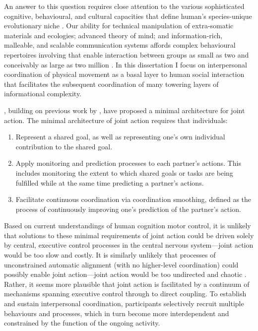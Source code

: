 \begin{CJK}{UTF8}{gbsn}
An answer to this question requires close attention to the various sophisticated cognitive, behavioural, and cultural capacities that define human's species-unique evolutionary niche \citep{Roepstorff2010,Clark2015,Fuentes2016}. Our ability for technical manipulation of extra-somatic materials and ecologies; advanced theory of mind; and information-rich, malleable, and scalable communication systems affords complex behavioural repertoires involving that enable interaction between groups as small as two and conceivably as large as two million \citep{Nowak2017}.  In this dissertation I focus on interpersonal coordination of physical movement as a basal layer to human social interaction that facilitates the subsequent coordination of many towering layers of informational complexity.

\textcite{Vesper2010}, building on previous work by  \textcite{Sebanz2006}, have proposed a minimal architecture for joint action.  The minimal architecture of joint action requires that individuals:

\begin{enumerate}
  \item Represent a shared goal, as well as representing one’s own individual contribution to the shared goal.
  \item Apply monitoring and prediction processes to each partner’s actions. This includes monitoring the extent to which shared goals or tasks are being fulfilled while at the same time predicting a partner’s actions.
  \item Facilitate continuous coordination via coordination smoothing, defined as the process of continuously improving one’s prediction of the partner’s action.
\end{enumerate}

Based on current understandings of human cognition motor control, it is unlikely that solutions to these minimal requirements of joint action could be driven solely by central, executive control processes in the central nervous system---joint action would be too slow and costly.  It is similarly unlikely that processes of unconstrained automatic alignment (with no higher-level coordination) could possibly enable joint action---joint action would be too undirected and chaotic \citep{Fusaroli2014}.  Rather, it seems more plausible that joint action is facilitated by a continuum of mechanisms spanning executive control through to direct coupling.  To establish and sustain interpersonal coordination, participants selectively recruit multiple behaviours and processes, which in turn become more interdependent and constrained by the function of the ongoing activity.


\end{CJK}
